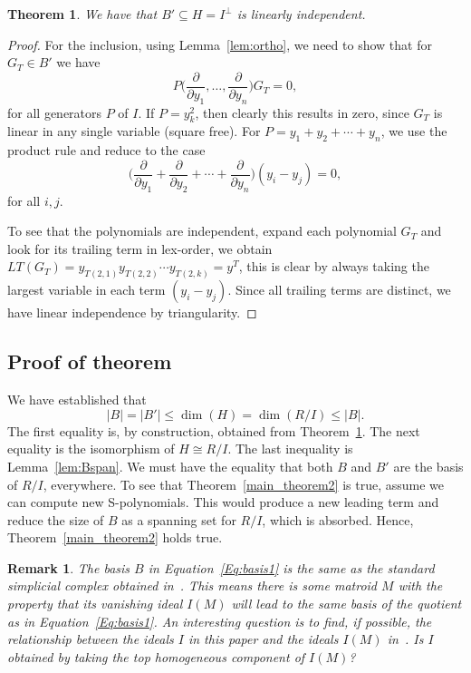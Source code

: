 \documentclass[10pt,a4paper]{article}
\newtheorem{theorem}{Theorem}[section]
\newtheorem{remark}{Remark}[section]
\begin{document}
\begin{theorem}\label{thm:indB}
 We have that $B'\subseteq H=I^\perp$ is linearly independent.
\end{theorem}
\begin{proof}
 For the inclusion, using Lemma~\ref{lem:ortho}, we need to show that for $G_T\in B'$ we have
   $$P\big({\textstyle \frac{ \partial}{ \partial y_1},\ldots,\frac{ \partial}{ \partial y_n}}\big) G_T =0, $$
   for all generators $P$ of $I$. If $P=y_k^2$, then clearly this results in zero, since $G_T$ is linear in any single variable (square free).
   For $P=y_1+y_2+\cdots+y_n$, we use the product rule and reduce to the case
   $$\big({\textstyle \frac{ \partial}{ \partial y_1}+ \frac{ \partial}{ \partial y_2}+\cdots+\frac{ \partial}{ \partial y_n}}\big) (y_i-y_j)=0,$$
   for all $i,j$.
  
  To see that the  polynomials are independent, expand each polynomial $G_T$ and look for its trailing term in lex-order, we obtain $LT(G_T)=y_{T(2,1)}   y_{T(2,2)} \cdots  y_{T(2,k)}  = y^T$,
this is clear by always taking the largest variable in each term $(y_i-y_j)$. Since all trailing terms are distinct, we have  linear independence by  triangularity.
\end{proof}

\subsection{Proof of theorem}\label{ss:proofthm}
We have established that
 $$|B|=|B'|\le \dim(H) =\dim(R/I)\le |B|.$$
 The first equality is, by construction, obtained from Theorem~\ref{thm:indB}. The next equality is the isomorphism of $H\cong R/I$. The last inequality is 
 Lemma~\ref{lem:Bspan}.  We must have the equality that both $B$ and $B'$ are the basis of $R/I$, everywhere. To see that Theorem~\ref{main_theorem2}
 is true, assume we can compute new S-polynomials. 
 This would produce a new leading term and reduce the size of $B$ as a spanning set for $R/I$, which is absorbed.
 Hence,  Theorem~\ref{main_theorem2} holds true.
 
 \begin{remark}\label{rem:stump}
   The basis $B$ in Equation~\eqref{Eq:basis1} is the same as the standard simplicial complex obtained in~\cite{ESS}. This means there is some 
   matroid $M$ with the property that its vanishing ideal $I(M)$ will lead to the same basis of the quotient as in Equation~\eqref{Eq:basis1}. An interesting question is to find,
   if possible, the relationship between the ideals $I$ in this paper and the ideals $I(M)$ in~\cite{ESS}. Is $I$ obtained by taking the top  homogeneous component 
   of $I(M)$?
 \end{remark}
\end{document}
